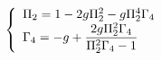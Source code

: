 \begin{equation}{\label{S}}
    \left\{\begin{array}{l}
    \Pi_2=1-2g\Pi_2^2-g\Pi_2^4\Gamma_4
    \\
    \Gamma_4=-g+\dfrac{2g\Pi_2^2\Gamma_4}{\Pi_2^2\Gamma_4-1}
    \end{array}\right.
\end{equation}

